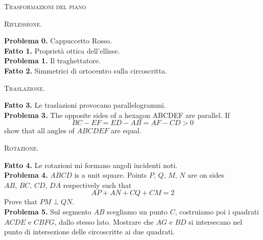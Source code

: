 \documentclass[a4paper]{article}
\theoremstyle{remark}
\theoremstyle{definition}
\begin{document}
\begin{center}
	\textsc{Trasformazioni del piano}
\end{center}
\begin{multicols}{2}

\begin{center}
	\textsc{Riflessione.}
\end{center}

\textbf{Problema 0.} Cappuccetto Rosso.\\

\textbf{Fatto 1.} Proprietà ottica dell'ellisse. \\ 

\textbf{Problema 1.} Il traghettatore. \\

\textbf{Fatto 2.} Simmetrici di ortocentro sulla circoscritta. \\

\begin{center}
	\textsc{Traslazione.}
\end{center}

\textbf{Fatto 3.} Le traslazioni provocano parallelogrammi.\\

\textbf{Problema 3.} The opposite sides of a
hexagon ABCDEF are parallel. If
$$  BC-EF = ED-AB = AF-CD > 0  $$ show
that all angles of $ ABCDEF $ are equal. \\

\begin{center}
	\textsc{Rotazione.}
\end{center}

\textbf{Fatto 4.} Le rotazioni mi formano angoli incidenti noti.\\

\textbf{Problema 4.} $ ABCD $ is a unit square.
Points $ P,\, Q,\, M,\, N $ are on sides $ AB,\, BC,\,
CD,\, DA $ respectively such that
$$  AP + AN + CQ + CM = 2  $$
Prove that $ PM \perp QN $. \\

\textbf{Problema 5.} Sul segmento $ AB $ scegliamo un punto $ C $, costruiamo poi i quadrati $ ACDE $ e $ CBFG $, dallo stesso lato. Mostrare che $ AG $ e $ BD $ si intersecano nel punto di intersezione delle circoscritte ai due quadrati.\\

\end{multicols}
\end{document}
